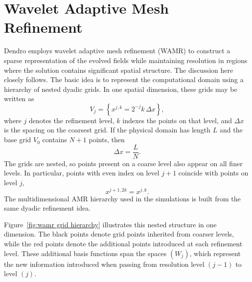 \section{Wavelet Adaptive Mesh Refinement}
\label{sec:wamr}

Dendro employs wavelet adaptive mesh refinement (WAMR) to construct a sparse representation of the evolved fields while maintaining resolution in regions where the solution contains significant spatial structure. The discussion here closely follows\cite{DeBuhr2018RelativisticHydroWavelets}. The basic idea is to represent the computational domain using a hierarchy of nested dyadic grids. In one spatial dimension, these grids may be written as
\begin{equation}
    V_j
    =
    \left\{
        x^{j,k}
        =
        2^{-j} k\,\Delta x
    \right\},
\end{equation}
where $j$ denotes the refinement level, $k$ indexes the points on that level, and $\Delta x$ is the spacing on the coarsest grid. If the physical domain has length $L$ and the base grid $V_0$ contains $N+1$ points, then
\begin{equation}
    \Delta x = \frac{L}{N}.
\end{equation}
The grids are nested, so points present on a coarse level also appear on all finer levels. In particular, points with even index on level $j+1$ coincide with points on level $j$,
\begin{equation}
    x^{j+1,2k} = x^{j,k}.
\end{equation}
The multidimensional AMR hierarchy used in the simulations is built from the same dyadic refinement idea.

Figure~\ref{fig:wamr grid hierarchy} illustrates this nested structure in one dimension. The black points denote grid points inherited from coarser levels, while the red points denote the additional points introduced at each refinement level. These additional basis functions span the spaces $(W_j)$, which represent the new information introduced when passing from resolution level $(j-1)$ to level $(j)$.

